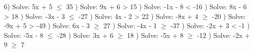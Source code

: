 \documentclass{article}%
\begin{document}
6) Solve: 5x + 5 $\leq$ 35%
\newline%
\newline%
) Solve: 9x + 6 > 15%
\newline%
\newline%
) Solve: -1x - 8 < -16%
\newline%
\newline%
) Solve: 8x - 6 > 18%
\newline%
\newline%
) Solve: -3x - 3 $\leq$ -27%
\newline%
\newline%
) Solve: 4x - 2 > 22%
\newline%
\newline%
) Solve: -8x + 4 $\geq$ -20%
\newline%
\newline%
) Solve: -9x + 5 > -49%
\newline%
\newline%
) Solve: 6x - 3 $\geq$ 27%
\newline%
\newline%
) Solve: -4x - 1 $\geq$ -37%
\newline%
\newline%
) Solve: -2x + 3 < -1%
\newline%
\newline%
) Solve: -5x - 8 $\leq$ -28%
\newline%
\newline%
) Solve: 3x + 6 $\geq$ 18%
\newline%
\newline%
) Solve: -5x + 8 $\geq$ -12%
\newline%
\newline%
) Solve: -2x + 9 $\geq$ 7%
\newline%
\newline%
\end{document}
